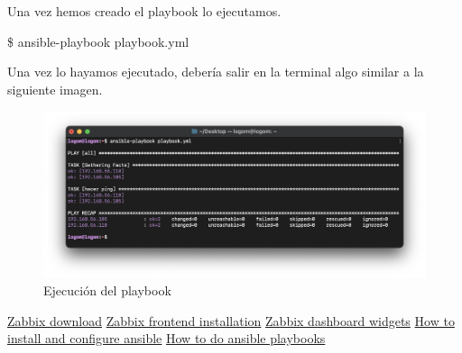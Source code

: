 Una vez hemos creado el playbook lo ejecutamos.
    \begin{tcolorbox}[colback=black!10, halign=left]
        \$ ansible-playbook playbook.yml
    \end{tcolorbox}

Una vez lo hayamos ejecutado, debería salir en la terminal algo similar a la siguiente imagen.
    \begin{figure}[H]
        \centering
        \includegraphics[scale=0.45]{images/ejecucion_playbook.png}
        \caption{Ejecución del playbook}
        \label{fig:ejecucion_playbook}
    \end{figure}

\begin{thebibliography}{0}
    
    \bibitem{} \href{https://www.zabbix.com/download?}{Zabbix download}
    \bibitem{} \href{https://www.zabbix.com/documentation/5.0/manual/installation/frontend}{Zabbix frontend installation}
    \bibitem{} \href{https://www.zabbix.com/documentation/5.4/en/manual/web_interface/frontend_sections/monitoring/dashboard/widgets}{Zabbix dashboard widgets}
    \bibitem{} \href{https://www.digitalocean.com/community/tutorials/how-to-install-and-configure-ansible-on-ubuntu-20-04-es}{How to install and configure ansible}
    \bibitem{} \href{https://www.youtube.com/watch?v=Wuv0ZPOMLf0}{How to do ansible playbooks}
\end{thebibliography}


